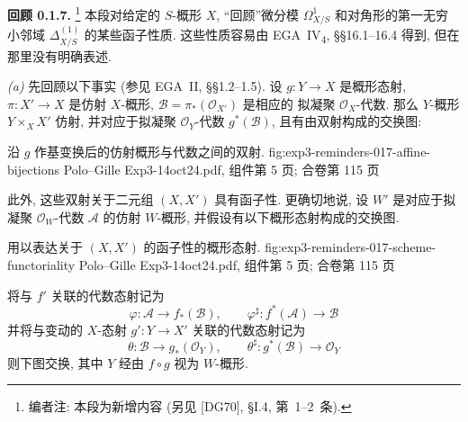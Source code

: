 
\medskip
\noindent{}\textbf{回顾 0.1.7.}
\footnote{编者注: 本段为新增内容 (另见 [DG70], \S I.4, 第~1--2~条).}
本段对给定的 \(S\)-概形 \(X\), ``回顾''微分模
\(\Omega^1_{X/S}\) 和对角形的第一无穷小邻域
\(\Delta^{(1)}_{X/S}\) 的某些函子性质. 这些性质容易由
EGA~IV\textsubscript{4}, \S\S16.1--16.4 得到, 但在那里没有明确表述.

\smallskip
\noindent\textit{(a)} 先回顾以下事实 (参见 EGA~II, \S\S1.2--1.5).
设 \(g:Y\to X\) 是概形态射, \(\pi:X'\to X\) 是仿射
\(X\)-概形, \(\mathscr B=\pi_*(\mathscr O_{X'})\) 是相应的
拟凝聚 \(\mathscr O_X\)-代数. 那么 \(Y\)-概形 \(Y\times_X X'\)
仿射, 并对应于拟凝聚 \(\mathscr O_Y\)-代数 \(g^*(\mathscr B)\),
且有由双射构成的交换图:

  {沿 \(g\) 作基变换后的仿射概形与代数之间的双射.}
  {fig:exp3-reminders-017-affine-bijections}
  {Polo--Gille Exp3-14oct24.pdf, 组件第 5 页; 合卷第 115 页}

此外, 这些双射关于二元组 \((X,X')\) 具有函子性. 更确切地说,
设 \(W'\) 是对应于拟凝聚 \(\mathscr O_W\)-代数 \(\mathscr A\)
的仿射 \(W\)-概形, 并假设有以下概形态射构成的交换图.

  {用以表达关于 \((X,X')\) 的函子性的概形态射.}
  {fig:exp3-reminders-017-scheme-functoriality}
  {Polo--Gille Exp3-14oct24.pdf, 组件第 5 页; 合卷第 115 页}

将与 \(f'\) 关联的代数态射记为
\[
 \varphi:\mathscr A\longrightarrow f_*(\mathscr B),
 \qquad
 \varphi^\sharp:f^*(\mathscr A)\longrightarrow\mathscr B
\]
并将与变动的 \(X\)-态射 \(g':Y\to X'\) 关联的代数态射记为
\[
 \theta:\mathscr B\longrightarrow g_*(\mathscr O_Y),
 \qquad
 \theta^\sharp:g^*(\mathscr B)\longrightarrow\mathscr O_Y
\]
则下图交换, 其中 \(Y\) 经由 \(f\circ g\) 视为 \(W\)-概形.

